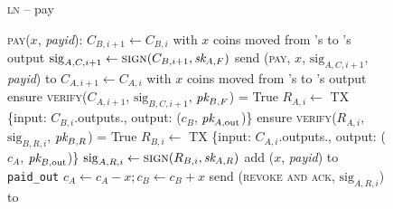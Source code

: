 \begin{figure}[H]
  \begin{processbox}{\textsc{ln} -- pay}
    \begin{algorithmic}[1]
      \State \textsc{pay}($x$, \textit{payid}): 
      \Indent
        \State $C_{B, i+1} \gets C_{B, i}$ with $x$ coins moved from \alice's to
        \bob's output
        \State $\mathrm{sig}_{A, C, i+1} \gets \textsc{sign}(C_{B, i+1}, \textit{sk}_{A,
        F})$ 
        \State send (\textsc{pay}, $x$, $\mathrm{sig}_{A, C, i+1}$,
        \textit{payid}) to \bob
        \State {}
        \State {}
        \State {}
        \State {} 
        \State {}
        \State {}
        \State {}
        \State $C_{A, i+1} \gets C_{A, i}$ with $x$ coins moved from \alice's to
        \bob's output
        \State ensure \textsc{verify}($C_{A, i+1}$, $\mathrm{sig}_{B, C, i+1}$,
        $\textit{pk}_{B, F}$) = True
        \State $R_{A, i} \gets$ TX \{input: $C_{B, i}$.outputs.\alice, output:
        ($c_B$, $\textit{pk}_{A, \mathrm{out}}$)\}
        \State ensure \textsc{verify}($R_{A, i}$, $\mathrm{sig}_{B, R, i}$,
        $\textit{pk}_{B, R}$) = True
        \State $R_{B, i} \gets$ TX \{input: $C_{A, i}$.outputs.\bob, output:
        ($c_A$, $\textit{pk}_{B, \mathrm{out}}$)\}
        \State $\mathrm{sig}_{A, R, i} \gets \textsc{sign}(R_{B, i}, \textit{sk}_{A, R})$
        \State add ($x$, \textit{payid}) to \texttt{paid\_out}
        \State $c_A \gets c_A - x; c_B \gets c_B + x$
        \State send (\textsc{revoke and ack}, $\mathrm{sig}_{A, R, i}$) to \bob
        \State {}
        \State {}
        \State {}
        \State {}
      \EndIndent
    \end{algorithmic}
  \end{processbox}
  \caption{}
  \label{code:ln:pay}
\end{figure}

